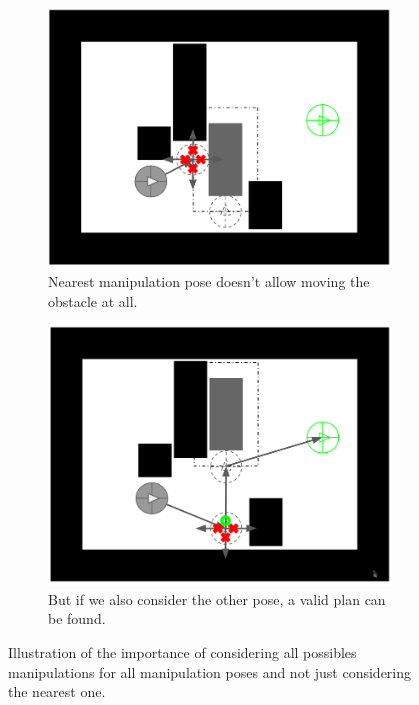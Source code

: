 \begin{figure}[H]
\centering
\begin{subfigure}{.5\textwidth}
  \centering
  \includegraphics[width=\linewidth]{Figures/Manipulation_Pose/manip_pose_1.png}
  \caption{Nearest manipulation pose doesn't allow moving the obstacle at all.}
  \label{fig:manip_pose_1}
\end{subfigure}%
\begin{subfigure}{.5\textwidth}
  \centering
  \includegraphics[width=\linewidth]{Figures/Manipulation_Pose/manip_pose_2.png}
  \caption{But if we also consider the other pose, a valid plan can be found.}
  \label{fig:manip_pose_2}
\end{subfigure}
\caption{Illustration of the importance of considering all possibles manipulations for all manipulation poses and not just considering the nearest one.}
\label{fig:manipulation_poses}
\end{figure}

